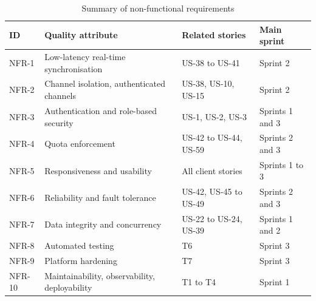 \documentclass[12pt,a4paper]{report}
\begin{document}
\begin{table}[htbp]
\centering
\caption{Summary of non-functional requirements}
\label{tab:nfr-summary}
\begin{tabular}{@{}p{}p{}p{}p{}@{}}
\toprule
\textbf{ID} & \textbf{Quality attribute} & \textbf{Related stories} & \textbf{Main sprint} \\
\midrule
NFR-1 & Low-latency real-time synchronisation & US-38 to US-41 & Sprint 2 \\
NFR-2 & Channel isolation, authenticated channels & US-38, US-10, US-15 & Sprint 2 \\
NFR-3 & Authentication and role-based security & US-1, US-2, US-3 & Sprints 1 and 3 \\
NFR-4 & Quota enforcement & US-42 to US-44, US-59 & Sprints 2 and 3 \\
NFR-5 & Responsiveness and usability & All client stories & Sprints 1 to 3 \\
NFR-6 & Reliability and fault tolerance & US-42, US-45 to US-49 & Sprints 2 and 3 \\
NFR-7 & Data integrity and concurrency & US-22 to US-24, US-39 & Sprints 1 and 2 \\
NFR-8 & Automated testing & T6 & Sprint 3 \\
NFR-9 & Platform hardening & T7 & Sprint 3 \\
NFR-10 & Maintainability, observability, deployability & T1 to T4 & Sprint 1 \\
\bottomrule
\end{tabular}
\end{table}

%

\providecommand{\umlactor}[5]{%
  \begin{scope}[shift={(#2,#3)}]
    \draw (0,0.5) circle (0.15);
    \draw (0,0.35) -- (0,-0.1);
    \draw (-0.25,0.22) -- (0.25,0.22);
    \draw (0,-0.1) -- (-0.2,-0.5);
    \draw (0,-0.1) -- (0.2,-0.5);
    \node[font=\scriptsize\bfseries, align=center, text width=1.9cm, below] at (0,-0.5) {#4};
  \end{scope}
  \coordinate (#1) at ($(#2,#3)+(#5,0.1)$);
  \coordinate (#1-top) at ($(#2,#3)+(0,0.72)$);
  \coordinate (#1-bot) at ($(#2,#3)+(0,-1.1)$);
}
\providecommand{\fitwidth}[1]{\resizebox{\ifdim\width>\linewidth\linewidth\else\width\fi}{!}{#1}}
\end{document}

